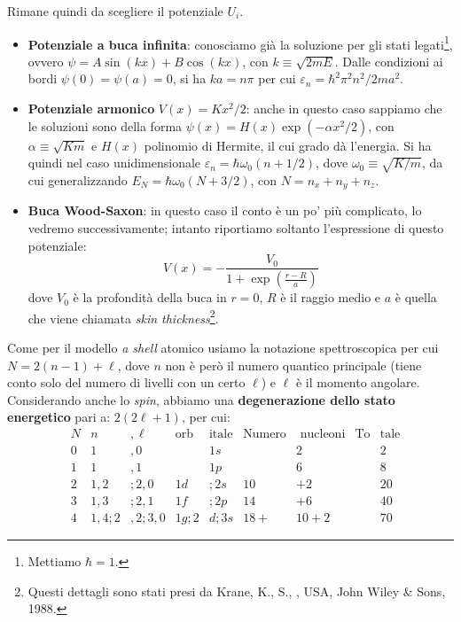 Rimane quindi da scegliere il potenziale $U_i$.
\begin{itemize}
    \item \textbf{Potenziale a buca infinita}: conosciamo già la soluzione per gli stati legati\footnote{Mettiamo $\hbar=1$.}, ovvero $\psi = A \sin (kx) + B \cos (kx)$, con $k\equiv \sqrt{2mE}$. Dalle condizioni ai bordi $\psi(0)=\psi(a)=0$, si ha $ka = n\pi$ per cui $\varepsilon_n = \hbar^2 \pi^2  n^2 / 2ma^2$.
    \item \textbf{Potenziale armonico} $V(x)=Kx^2/2$: anche in questo caso sappiamo che le soluzioni sono della forma $\psi(x) = H(x)\exp{(-\alpha x^2/2)}$, con $\alpha \equiv \sqrt{Km}$ e $H(x)$ polinomio di Hermite, il cui grado dà l'energia. Si ha quindi nel caso unidimensionale $\varepsilon_n = \hbar \omega_0 (n+1/2)$, dove $\omega_0 \equiv \sqrt{K/m}$, da cui generalizzando $E_N= \hbar \omega_0 (N+3/2)$, con $N= n_x+n_y+n_z$.
    \item \textbf{Buca Wood-Saxon}: in questo caso il conto è un po' più complicato, lo vedremo successivamente; intanto riportiamo soltanto l'espressione di questo potenziale:
    $$V(x) = - \frac{V_0}{1+\exp{(\frac{r-R}{a})}}$$
    dove $V_0$ è la profondità della buca in $r=0$, $R$ è il raggio medio e $a$ è quella che viene chiamata \textit{skin thickness}\footnote{Questi dettagli sono stati presi da Krane, K., S., \textit{}, USA, John Wiley \& Sons, 1988.}.
\end{itemize}
\noindent Come per il modello \textit{a shell} atomico usiamo la notazione spettroscopica per cui $N = 2(n-1)+\ell$, dove $n$ non è però il numero quantico principale (tiene conto solo del numero di livelli con un certo $\ell$) e $\ell$ è il momento angolare. Considerando anche lo \textit{spin}, abbiamo una \textbf{degenerazione dello stato energetico} pari a: $2(2\ell+1)$, per cui:
\begin{displaymath}
\begin{aligned}
&N & n&,\ell & \text{orb}&\text{itale} & \text{Numero}&\text{ nucleoni} & \text{To}&\text{tale}\\
&0 & 1&,0 & &1s & &2 & &2   \\
&1 & 1&,1 & &1p & &6 & &8   \\
&2 & 1,2&;2,0 & 1d&;2s & 10&+2 & &20 \\
&3 & 1,3&;2,1 & 1f&;2p & 14&+6 & &40   \\
&4 & 1,4;2&,2;3,0 & 1g;2&d;3s & 18+&10+2 & &70
\end{aligned}
\end{displaymath}
